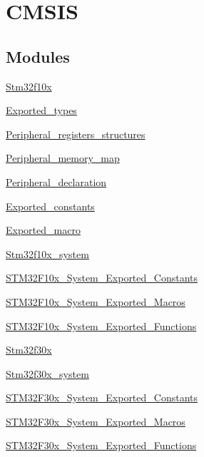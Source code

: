 \hypertarget{group___c_m_s_i_s}{\section{C\-M\-S\-I\-S}
\label{group___c_m_s_i_s}
}
\subsection*{Modules}
\begin{DoxyCompactItemize}
\item 
\hyperlink{group__stm32f10x}{Stm32f10x}
\item 
\hyperlink{group___exported__types}{Exported\-\_\-types}
\item 
\hyperlink{group___peripheral__registers__structures}{Peripheral\-\_\-registers\-\_\-structures}
\item 
\hyperlink{group___peripheral__memory__map}{Peripheral\-\_\-memory\-\_\-map}
\item 
\hyperlink{group___peripheral__declaration}{Peripheral\-\_\-declaration}
\item 
\hyperlink{group___exported__constants}{Exported\-\_\-constants}
\item 
\hyperlink{group___exported__macro}{Exported\-\_\-macro}
\item 
\hyperlink{group__stm32f10x__system}{Stm32f10x\-\_\-system}
\item 
\hyperlink{group___s_t_m32_f10x___system___exported___constants}{S\-T\-M32\-F10x\-\_\-\-System\-\_\-\-Exported\-\_\-\-Constants}
\item 
\hyperlink{group___s_t_m32_f10x___system___exported___macros}{S\-T\-M32\-F10x\-\_\-\-System\-\_\-\-Exported\-\_\-\-Macros}
\item 
\hyperlink{group___s_t_m32_f10x___system___exported___functions}{S\-T\-M32\-F10x\-\_\-\-System\-\_\-\-Exported\-\_\-\-Functions}
\item 
\hyperlink{group__stm32f30x}{Stm32f30x}
\item 
\hyperlink{group__stm32f30x__system}{Stm32f30x\-\_\-system}
\item 
\hyperlink{group___s_t_m32_f30x___system___exported___constants}{S\-T\-M32\-F30x\-\_\-\-System\-\_\-\-Exported\-\_\-\-Constants}
\item 
\hyperlink{group___s_t_m32_f30x___system___exported___macros}{S\-T\-M32\-F30x\-\_\-\-System\-\_\-\-Exported\-\_\-\-Macros}
\item 
\hyperlink{group___s_t_m32_f30x___system___exported___functions}{S\-T\-M32\-F30x\-\_\-\-System\-\_\-\-Exported\-\_\-\-Functions}

\end{DoxyCompactItemize}
